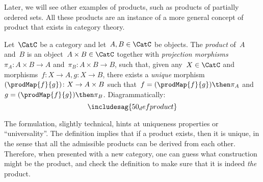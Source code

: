 Later, we will see other examples of products, such as products of partially ordered sets.
All these products are an instance of a more general concept of product that exists in category
theory.
 
\begin{shaded}
\begin{definition}
Let~$\CatC$ be a category and let~$A,B\in \CatC$ be objects. The \emph{product} of~$A$ and~$B$ is an object~$A \times B \in \CatC$ together with \emph{projection morphisms}~$\pi_A \colon A \times B \to A$ and~$\pi_B \colon A \times B \to B$, such that, given any~$X \in \CatC$ and morphisms~$f \colon X \to A, g \colon X \to B$, there exists a \emph{unique} morphism~$(\prodMap{f}{g}) \colon X \to A \times B$ such that~$f = (\prodMap{f}{g})\then \pi_A$ and~$g=(\prodMap{f}{g})\then \pi_B$. Diagrammatically:
\begin{equation}
\includesag{50_defproduct}
\end{equation}
\end{definition}
\end{shaded}

The formulation, slightly technical, hints at uniqueness properties or ``universality''. The definition implies that if a product exists, then it is unique, in the sense that all the admissible products can be derived from each other. Therefore, when presented with a new category, one can guess what construction might be the product, and check the definition to make sure that it is indeed \emph{the} product.

